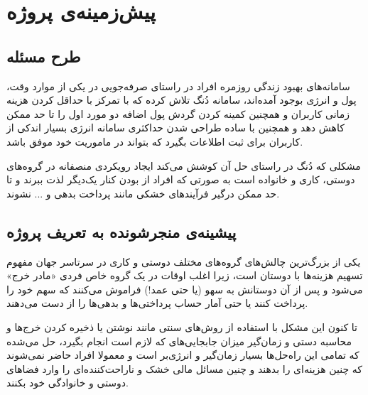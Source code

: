 


\chapter{
	پیش‌زمینه‌ی پروژه
}



\section{طرح مسئله}
سامانه‌های بهبود زندگی روزمره افراد در راستای صرفه‌جویی در یکی از موارد وقت، پول و انرژی بوجود آمده‌اند، سامانه دُنگ تلاش کرده که با تمرکز با  حداقل کردن هزینه زمانی کاربران و همچنین کمینه کردن گردش پول اضافه دو مورد اول را تا حد ممکن کاهش دهد و همچنین با ساده طراحی شدن حداکثری سامانه انرژی بسیار اندکی از کاربران برای ثبت اطلاعات بگیرد که بتواند در ماموریت خود موفق باشد. 

مشکلی که دُنگ در راستای حل آن کوشش می‌کند ایجاد رویکردی منصفانه در گروه‌های دوستی، کاری و خانواده است به صورتی که افراد از بودن کنار یک‌دیگر لذت ببرند و تا حد ممکن درگیر فرآیند‌های خشکی مانند پرداخت بدهی و ... نشوند.


\section{پیشینه‌ی منجرشونده به تعریف پروژه}%

یکی از بزرگ‌ترین چالش‌های گروه‌های مختلف دوستی و کاری در سرتاسر جهان مفهوم تسهیم هزینه‌ها با دوستان است، زیرا اغلب اوقات در یک گروه خاص فردی «مادر خرج» می‌شود و پس از آن دوستانش به سهو (یا حتی عمد!) فراموش می‌کنند که سهم خود را پرداخت کنند یا حتی آمار حساب پرداختی‌ها و بدهی‌ها را از دست می‌دهند.

تا کنون این مشکل با استفاده از روش‌های سنتی مانند نوشتن یا ذخیره کردن خرج‌ها و محاسبه دستی و زمان‌گیر میزان جابجایی‌های که لازم است انجام بگیرد، حل می‌شده که تمامی این راه‌حل‌ها بسیار زمان‌گیر و انرژی‌بر است و معمولا افراد حاضر نمی‌شوند که چنین هزینه‌ای را بدهند و چنین مسائل مالی خشک و ناراحت‌کننده‌ای را وارد فضاهای دوستی و خانوادگی خود بکنند.

